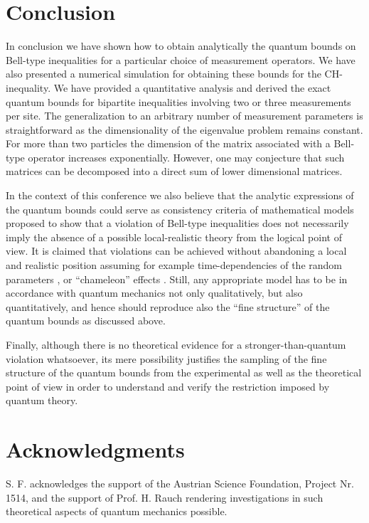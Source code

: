 \documentclass[pra,amsmath,amsfonts,showkeys,showpacs,preprint]{revtex4}
\begin{document}
\section{Conclusion}

In conclusion we have shown how to obtain analytically the quantum
bounds on Bell-type inequalities for a particular choice of
measurement operators. We have also presented a numerical simulation
for obtaining these bounds for the CH-inequality.
We have provided a quantitative
analysis and derived the exact quantum bounds for bipartite
inequalities involving two or three measurements per site. The
generalization to an arbitrary number of measurement parameters is
straightforward as  the dimensionality of the eigenvalue problem
remains constant. For more than two particles the dimension of the
matrix associated with a Bell-type operator increases exponentially.
However, one may conjecture that such matrices can
be decomposed into a direct sum of lower dimensional matrices.



In the context of this conference we also believe that the analytic expressions of the quantum bounds
could serve as consistency criteria of  mathematical
models proposed to show that a violation of Bell-type inequalities
does not necessarily imply the absence of a possible local-realistic
theory from the logical point of view. It is claimed that violations can be achieved
without abandoning a local and realistic position assuming for example
time-dependencies of
the random parameters \cite{hess-philipp01a},  or ``chameleon'' effects
\cite{accardi01}.
Still, any appropriate
model has to be in accordance with quantum mechanics not only
qualitatively, but also quantitatively, and hence should reproduce also the ``fine structure'' of
the quantum bounds as discussed above.

Finally, although there is no theoretical evidence for a stronger-than-quantum
violation whatsoever, its mere possibility justifies the sampling
of the fine structure of the quantum bounds from the experimental as well as the theoretical
point of view in order to understand and verify the restriction imposed by
quantum theory.

\section{Acknowledgments}
S. F. acknowledges the support of the Austrian
Science Foundation, Project Nr. 1514, and the support of
Prof. H. Rauch rendering investigations in such theoretical aspects
of quantum mechanics possible.
\end{document}

